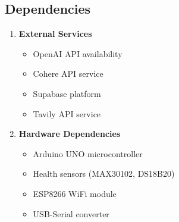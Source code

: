 \subsection{Dependencies}
\begin{enumerate}
    \item \textbf{External Services}
    \begin{itemize}
        \item OpenAI API availability
        \item Cohere API service
        \item Supabase platform
        \item Tavily API service
    \end{itemize}

    \item \textbf{Hardware Dependencies}
    \begin{itemize}
        \item Arduino UNO microcontroller
        \item Health sensors (MAX30102, DS18B20)
        \item ESP8266 WiFi module
        \item USB-Serial converter
    \end{itemize}
\end{enumerate} 